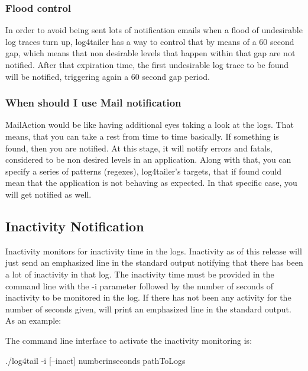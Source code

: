 \subsubsection{Flood control}
In order to avoid being sent lots of notification emails when a flood of
undesirable log traces turn up, log4tailer has a way to control that by means
of a 60 second gap, which means that non desirable levels that happen within
that gap are not notified. After that expiration time, the first undesirable
log trace to be found will be notified, triggering again a 60 second gap
period. 
 
\subsubsection{When should I use Mail notification}

MailAction would be like having additional eyes taking a look at the logs. That
means, that you can take a rest from time to time basically. If something is
found, then you are notified. At this stage, it will notify errors and fatals,
considered to be non desired levels in an application. Along with that, you can
specify a series of patterns (regexes), log4tailer's targets, that if found
could mean that the application is not behaving as expected. In that specific
case, you will get notified as well.
  
\subsection{Inactivity Notification}
\label{sec:inactivitysection}
Inactivity monitors for inactivity time in the logs. Inactivity as of this
release will just send an emphasized line in the standard output notifying that
there has been a lot of inactivity in that log. The inactivity time must be
provided in the command line with the -i parameter followed by the number of
seconds of inactivity to be monitored in the log.  If there has not been any
activity for the number of seconds given, \logftailer{} will print an
emphasized line in the standard output.\\ 
As an example:\\
 
The command line interface to activate the inactivity monitoring is:
\begin{cmd}
 ./log4tail -i [--inact] numberinseconds pathToLogs
\end{cmd}

